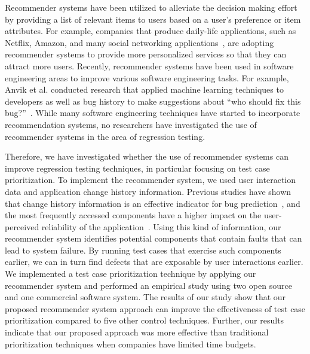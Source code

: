 Recommender systems have been utilized to alleviate the decision making 
effort by providing a list of relevant items to users based on a 
user's preference or item attributes.
For example, companies that produce daily-life applications, such as Netflix, 
Amazon, and many social networking applications~\cite{recomsurvey05},
are adopting recommender systems to provide more personalized services so that
they can attract more users. 
Recently, recommender systems have been used in software engineering areas 
to improve various software engineering tasks. 
For example, Anvik et al. conducted research that applied machine learning techniques
to developers as well as bug history to make suggestions about 
``who should fix this bug?''~\cite{who}.
While many software engineering techniques have started to incorporate 
recommendation systems, no researchers have investigated the use 
of recommender systems in the area of regression testing.

Therefore, we have investigated whether the use of recommender systems can
improve regression testing techniques, in particular focusing 
on test case prioritization. 
To implement the recommender system, we used user interaction
data and application change history information. 
Previous studies have shown that change history information is an effective indicator 
for bug prediction~\cite{raimund, method}, and the most frequently accessed components 
have a higher impact on the user-perceived reliability of the application~\cite{bryce08, jeff16}. 
Using this kind of information, our recommender system identifies potential components 
that contain faults that can lead to system failure.
By running test cases that exercise such components earlier, 
we can in turn find  defects that are exposable by user interactions earlier.
We implemented a test case prioritization technique by applying our recommender system
and performed an empirical study using two open source and one commercial software system.
The results of our study show that our proposed recommender system approach can 
improve the effectiveness of test case prioritization 
compared to five other control techniques.
Further, our results indicate that our proposed approach was more effective 
than traditional prioritization techniques 
when companies have limited time budgets. 

